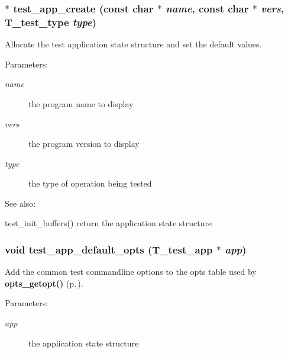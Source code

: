 \subsubsection{$\ast$ test\_\-app\_\-create (const char $\ast$ {\em name}, const char $\ast$ {\em vers}, {\bf T\_\-test\_\-type} {\em type})}\label{group__test__app_a0}


Allocate the test application state structure and set the default values.

\begin{Desc}
\item[Parameters: ]\par
\begin{description}
\item[{\em 
name}]the program name to display \item[{\em 
vers}]the program version to display \item[{\em 
type}]the type of operation being tested \end{description}
\end{Desc}
\begin{Desc}
\item[See also: ]\par
test\_\-init\_\-buffers() return the application state structure \end{Desc}
\subsubsection{\setlength{\rightskip}{0pt plus 5cm}void test\_\-app\_\-default\_\-opts ({\bf T\_\-test\_\-app} $\ast$ {\em app})}\label{group__test__app_a2}


Add the common test commandline options to the opts table used by {\bf opts\_\-getopt()} {\rm (p.\,\pageref{group__opts_a3})}.

\begin{Desc}
\item[Parameters: ]\par
\begin{description}
\item[{\em 
app}]the application state structure \end{description}
\end{Desc}
